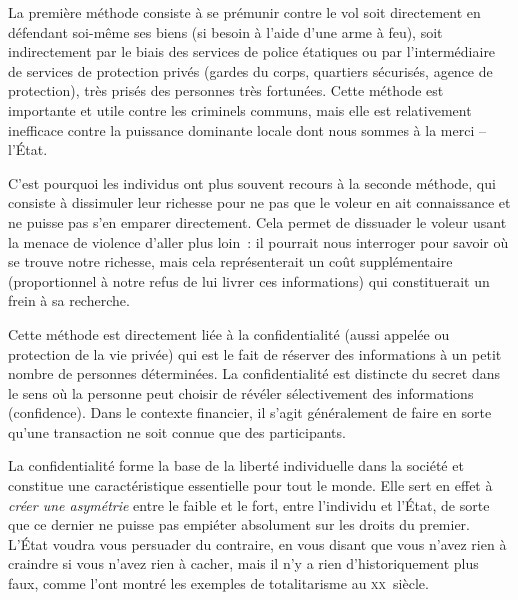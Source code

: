 La première méthode consiste à se prémunir contre le vol soit directement en défendant soi-même ses biens (si besoin à l'aide d'une arme à feu), soit indirectement par le biais des services de police étatiques ou par l'intermédiaire de services de protection privés (gardes du corps, quartiers sécurisés, agence de protection), très prisés des personnes très fortunées. Cette méthode est importante et utile contre les criminels communs, mais elle est relativement inefficace contre la puissance dominante locale dont nous sommes à la merci -- l'État.

C'est pourquoi les individus ont plus souvent recours à la seconde méthode, qui consiste à dissimuler leur richesse pour ne pas que le voleur en ait connaissance et ne puisse pas s'en emparer directement. Cela permet de dissuader le voleur usant la menace de violence d'aller plus loin~: il pourrait nous interroger pour savoir où se trouve notre richesse, mais cela représenterait un coût supplémentaire (proportionnel à notre refus de lui livrer ces informations) qui constituerait un frein à sa recherche.

Cette méthode est directement liée à la confidentialité (aussi appelée  ou protection de la vie privée) qui est le fait de réserver des informations à un petit nombre de personnes déterminées. La confidentialité est distincte du secret dans le sens où la personne peut choisir de révéler sélectivement des informations (confidence). Dans le contexte financier, il s'agit généralement de faire en sorte qu'une transaction ne soit connue que des participants.

La confidentialité forme la base de la liberté individuelle dans la société et constitue une caractéristique essentielle pour tout le monde. Elle sert en effet à \emph{créer une asymétrie} entre le faible et le fort, entre l'individu et l'État, de sorte que ce dernier ne puisse pas empiéter absolument sur les droits du premier. L'État voudra vous persuader du contraire, en vous disant que vous n'avez rien à craindre si vous n'avez rien à cacher, mais il n'y a rien d'historiquement plus faux, comme l'ont montré les exemples de totalitarisme au \textsc{xx}\ieme{}~siècle.

